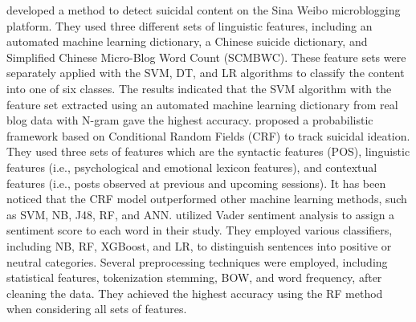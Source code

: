 \documentclass[sn-mathphys,Numbered]{sn-jnl}%
\begin{document}
\citet{26new10.1007/978-3-030-37429-7_17} developed a method to detect suicidal content on the Sina Weibo microblogging platform. They used three different sets of linguistic features, including an automated machine learning dictionary, a Chinese suicide dictionary, and Simplified Chinese Micro-Blog Word Count (SCMBWC). These feature sets were separately applied with the SVM, DT, and LR algorithms to classify the content into one of six classes. The results indicated that the SVM algorithm with the feature set extracted using an automated machine learning dictionary from real blog data with N-gram gave the highest accuracy. %
 \citet{15moulahi2017dare} proposed a probabilistic framework based on Conditional Random Fields (CRF) to track suicidal ideation. They used three sets of features which are the syntactic features (POS), linguistic features (i.e., psychological and emotional lexicon features), and contextual features (i.e., posts observed at previous and upcoming sessions). It has been noticed that the CRF model outperformed other machine learning methods, such as SVM, NB, J48, RF, and ANN. 
\citet{22rajesh2020suicidal} utilized Vader sentiment analysis to assign a sentiment score to each word in their study. They employed various classifiers, including NB, RF, XGBoost, and LR, to distinguish sentences into positive or neutral categories. Several preprocessing techniques were employed, including statistical features, tokenization stemming, BOW, and word frequency, after cleaning the data. They achieved the highest accuracy using the RF method when considering all sets of features. 
 
\end{document}
